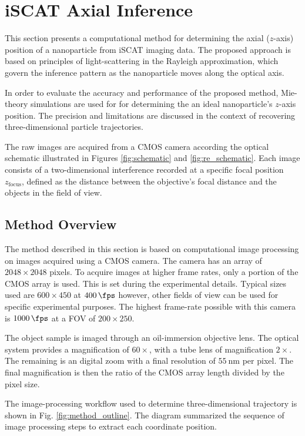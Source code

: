 \chapter{iSCAT Axial Inference}
\label{chap:ZEstimation}

This section presents a computational method for determining the axial ($z$-axis) position of a nanoparticle from iSCAT imaging data. The proposed approach is based on principles of light-scattering in the Rayleigh approximation, which govern the inference pattern as the nanoparticle moves along the optical axis. 

In order to evaluate the accuracy and performance of the proposed method, Mie-theory simulations are used for for determining the an ideal nanoparticle's $z$-axis position. The precision and limitations are discussed in the context of recovering three-dimensional particle trajectories.

The raw images are acquired from a CMOS camera according the optical schematic illustrated in Figures \ref{fig:schematic} and \ref{fig:re_schematic}. Each image consists of a two-dimensional interference recorded at a specific focal position $z_\mathrm{focus}$, defined as the distance between the objective's focal distance and the objects in the field of view.

\section{Method Overview}

The method described in this section is based on computational image processing on images acquired using a CMOS camera. The camera has an array of $2048 \times 2048$ pixels. To acquire images at higher frame rates, only a portion of the CMOS array is used. This is set during the experimental details. Typical sizes used are $600 \times 450$ at $\SI{400}{\fps}$ however, other fields of view can be used for specific experimental purposes. The highest frame-rate possible with this camera is $\SI{1000}{\fps}$ at a FOV of $200 \times 250$.

The object sample is imaged through an oil-immersion objective lens. The optical system provides a magnification of $60 \times$, with a tube lens of magnification $2\times$. The remaining is an digital zoom with a final resolution of $\SI{55}{\nm}$ per pixel. The final magnification is then the ratio of the CMOS array length divided by the pixel size.

The image-processing workflow used to determine three-dimensional trajectory is shown in Fig. \ref{fig:method_outline}. The diagram summarized the sequence of image processing steps to extract each coordinate position.

